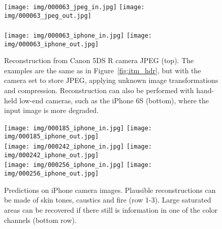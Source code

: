 \documentclass[acmtog]{acmart}
\newcommand{\figref}[1]{Figure~\ref{fig:#1}}
\newcommand\belowfigspace{-2pt}
\begin{document}
\begin{figure}
	\vspace{5pt}
	\newcommand\ww{0.236}
	\centering
	\texttt{[image: img/000063\_jpeg\_in.jpg]}
	\texttt{[image: img/000063\_jpeg\_out.jpg]}\vspace{3pt}\\
	\vspace{-5pt}
	\vspace{3pt}\\
	\texttt{[image: img/000063\_iphone\_in.jpg]}
	\texttt{[image: img/000063\_iphone\_out.jpg]}\vspace{3pt}\\
	\vspace{-5pt}
	\vspace{-10pt}
	\caption{\label{fig:itm_ldr} Reconstruction from Canon 5DS R camera JPEG (top). The examples are the same as in \figref{itm_hdr}, but with the camera set to store JPEG, applying unknown image transformations and compression. Reconstruction can also be performed with hand-held low-end cameras, such as the iPhone 6S (bottom), where the input image is more degraded.}
\end{figure}

\begin{figure}
	\vspace{5pt}
	\newcommand\ww{0.236}
	\centering
	\texttt{[image: img/000185\_iphone\_in.jpg]}
	\texttt{[image: img/000185\_iphone\_out.jpg]}\vspace{3pt}\\
	\texttt{[image: img/000242\_iphone\_in.jpg]}
	\texttt{[image: img/000242\_iphone\_out.jpg]}\vspace{3pt}\\
	\texttt{[image: img/000256\_iphone\_in.jpg]}
	\texttt{[image: img/000256\_iphone\_out.jpg]}\vspace{3pt}\\
	\vspace{-5pt}
	\vspace{-10pt}
	\caption{\label{fig:itm_iphone} Predictions on iPhone camera images. Plausible reconstructions can be made of skin tones, caustics and fire (row 1-3). Large saturated areas can be recovered if there still is information in one of the color channels (bottom row).}
	\vspace{\belowfigspace}
\end{figure}
\end{document}
